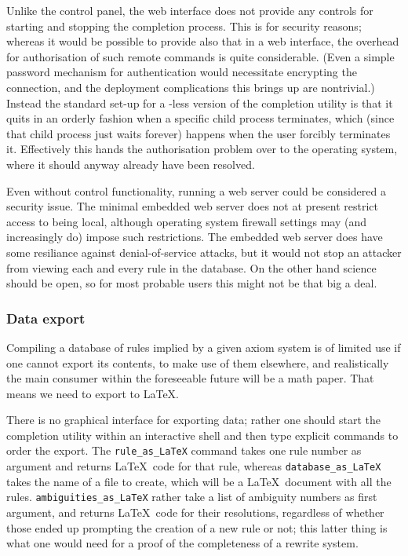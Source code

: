 \documentclass{article}
\theoremstyle{definition}
\begin{document}
Unlike the  control panel, the web interface does not 
provide any controls for starting and stopping the completion 
process. This is for security reasons; whereas it would be possible 
to provide also that in a web interface, the overhead for 
authorisation of such remote commands is quite considerable. (Even a 
simple password mechanism for authentication would necessitate 
encrypting the connection, and the deployment complications this 
brings up are nontrivial.) Instead the standard set-up for a 
-less version of the completion utility is that it quits 
in an orderly fashion when a specific child process terminates, which 
(since that child process just waits forever) happens when the user 
forcibly terminates it. Effectively this hands the authorisation 
problem over to the operating system, where it should anyway already 
have been resolved.

Even without control functionality, running a web server could be 
considered a security issue. The minimal embedded web server does not 
at present restrict access to being local, although operating system 
firewall settings may (and increasingly do) impose such restrictions. 
The embedded web server does have some resiliance against 
denial-of-service attacks, but it would not stop an attacker from 
viewing each and every rule in the database. On the other hand 
science should be open, so for most probable users this might not be 
that big a deal.




\subsubsection{Data export}

Compiling a database of rules implied by a given axiom system is of 
limited use if one cannot export its contents, to make use of them 
elsewhere, and realistically the main consumer within the foreseeable 
future will be a math paper. That means we need to export to \LaTeX.

There is no graphical interface for exporting data; rather one should 
start the completion utility within an interactive shell and then 
type explicit commands to order the export. The \verb|rule_as_LaTeX| 
command takes one rule number as argument and returns \LaTeX\ code 
for that rule, whereas \verb|database_as_LaTeX| takes the name of a 
file to create, which will be a \LaTeX\ document with all the rules. 
\verb|ambiguities_as_LaTeX| rather take a list of ambiguity numbers 
as first argument, and returns \LaTeX\ code for their resolutions, 
regardless of whether those ended up prompting the creation of a new 
rule or not; this latter thing is what one would need for a proof of 
the completeness of a rewrite system.
\end{document}

